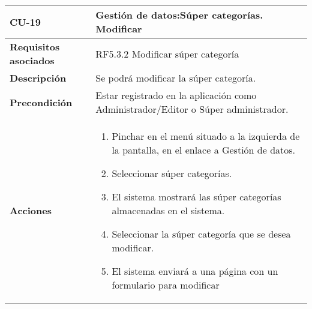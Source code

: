 \newpage
\begin{longtable}[H]{@{}ll@{}}
\toprule
\begin{minipage}[b]{0.23\columnwidth}\raggedright\strut
\textbf{CU-19}\strut
\end{minipage} & \begin{minipage}[b]{0.71\columnwidth}\raggedright\strut
\textbf{Gestión de datos:Súper categorías. Modificar}\strut
\end{minipage}\tabularnewline
\midrule
\endhead
\begin{minipage}[t]{0.23\columnwidth}\raggedright\strut
\textbf{Requisitos asociados}\strut
\end{minipage} & \begin{minipage}[t]{0.71\columnwidth}\raggedright\strut
RF5.3.2 Modificar súper categoría\strut
\end{minipage}\tabularnewline
\begin{minipage}[t]{0.23\columnwidth}\raggedright\strut
\textbf{Descripción}\strut
\end{minipage} & \begin{minipage}[t]{0.71\columnwidth}\raggedright\strut
Se podrá modificar la súper categoría.
\strut
\end{minipage}\tabularnewline
\begin{minipage}[t]{0.23\columnwidth}\raggedright\strut
\textbf{Precondición}\strut
\end{minipage} & \begin{minipage}[t]{0.71\columnwidth}\raggedright\strut
Estar registrado en la aplicación como Administrador/Editor o Súper administrador.\strut
\end{minipage}\tabularnewline
\begin{minipage}[t]{0.23\columnwidth}\raggedright\strut
\textbf{Acciones}\strut
\end{minipage} & \begin{minipage}[t]{0.71\columnwidth}\raggedright\strut
\begin{enumerate}
\def\labelenumi{\arabic{enumi}.}
\tightlist
\item
Pinchar en el menú situado a la izquierda de la pantalla, en el
enlace a Gestión de datos.
\item
Seleccionar súper categorías.
\item
El sistema mostrará las súper categorías almacenadas en el sistema.
\item
Seleccionar la súper categoría que se desea modificar.
\item
El sistema enviará a una página con un formulario para modificar

\end{enumerate}
\end{minipage}
\end{longtable}
